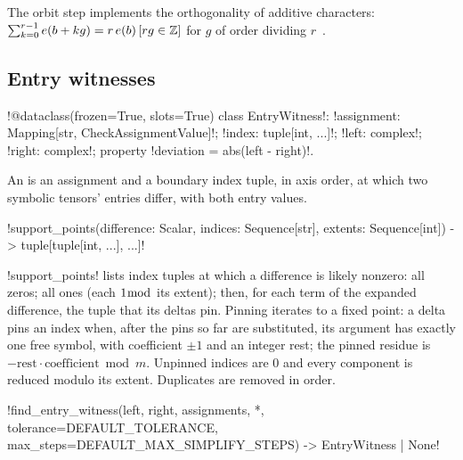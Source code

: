 The orbit step implements the orthogonality of additive characters: $\sum_{k=0}^{r-1}e(b+kg)=r\,e(b)\,[rg\in\mathbb{Z}]$ for $g$ of order dividing $r$~\cite{berndt1998gauss}.

\subsection{Entry witnesses}

\begin{signature}
\py!@dataclass(frozen=True, slots=True) class EntryWitness!: \py!assignment: Mapping[str, CheckAssignmentValue]!; \py!index: tuple[int, ...]!; \py!left: complex!; \py!right: complex!; property \py!deviation = abs(left - right)!.
\end{signature}

An  is an assignment and a boundary index tuple, in axis order, at which two symbolic tensors' entries differ, with both entry values.

\begin{signature}
\py!support_points(difference: Scalar, indices: Sequence[str], extents: Sequence[int]) -> tuple[tuple[int, ...], ...]!
\end{signature}

\py!support_points! lists index tuples at which a difference is likely nonzero: all zeros; all ones (each $1 \bmod$ its extent); then, for each term of the expanded difference, the tuple that its deltas pin. Pinning iterates to a fixed point: a delta pins an index when, after the pins so far are substituted, its argument has exactly one free symbol, with coefficient $\pm1$ and an integer rest; the pinned residue is $-\text{rest}\cdot\text{coefficient}\bmod m$. Unpinned indices are $0$ and every component is reduced modulo its extent. Duplicates are removed in order.

\begin{signature}
\py!find_entry_witness(left, right, assignments, *, tolerance=DEFAULT_TOLERANCE, max_steps=DEFAULT_MAX_SIMPLIFY_STEPS) -> EntryWitness | None!
\end{signature}

